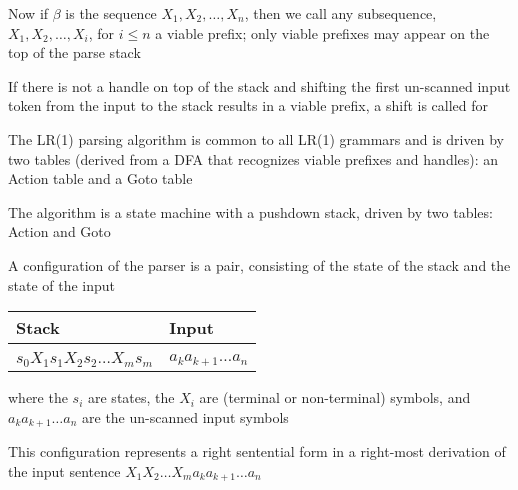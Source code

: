 \documentclass[8pt,a4paper,compress]{beamer}
\begin{document}
\begin{frame}[fragile]
\pause

Now if $\beta$ is the sequence $X_1, X_2, \dots , X_n$, then we call any subsequence, $X_1, X_2, \dots , X_i$, for $i \leq n$ a viable prefix; only viable prefixes may appear on the top of the parse stack

\pause
\bigskip

If there is not a handle on top of the stack and shifting the first un-scanned input token from the input to the stack results in a viable prefix, a shift is called for

\pause
\bigskip

The LR(1) parsing algorithm is common to all LR(1) grammars and is driven by two tables (derived from a DFA that recognizes viable prefixes and handles): an Action table and a Goto table

\pause
\bigskip

The algorithm is a state machine with a pushdown stack, driven by two tables: Action and Goto

\pause
\bigskip

A configuration of the parser is a pair, consisting of the state of the stack and the state of the input

\begin{table}[H]
\begin{tabular}{ll}
Stack & Input \\ \hline \\
$s_0 X_1 s_1 X_2 s_2 \dots X_m s_m$ & $a_k a_{k +1} \dots a_n$
\end{tabular}
\end{table}

\noindent where the $s_i$ are states, the $X_i$ are (terminal or non-terminal) symbols, and $a_k a_{k +1} \dots a_n$ are the un-scanned input symbols

\pause
\bigskip

This configuration represents a right sentential form in a right-most derivation of the input sentence $X_1X_2 \dots X_m a_k a_{k +1} \dots a_n$
\end{frame}
\end{document}
